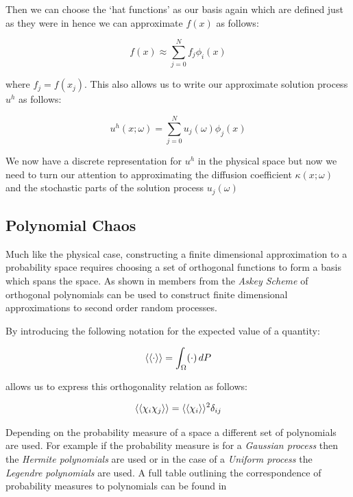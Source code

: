 Then we can choose the `hat functions' as our basis again which are defined
just as they were in  hence we can approximate $f(x)$
as follows:

\begin{equation}\label{eq:oned-stochastic-f-approx}
    f(x) \approx \sum_{j=0}^Nf_j\phi_i(x)
\end{equation}

where $f_j = f(x_j)$. This also allows us to write our approximate solution
process $u^h$ as follows:

\begin{equation}\label{eq:oned-stochastic-uh}
    u^h(x;\omega) = \sum_{j=0}^Nu_j(\omega)\phi_j(x)
\end{equation}

We now have a discrete representation for $u^h$ in the physical space but now
we need to turn our attention to approximating the diffusion coefficient
$\kappa(x;\omega)$ and the stochastic parts of the solution process
$u_j(\omega)$

\subsection{Polynomial Chaos}

Much like the physical case, constructing a finite dimensional approximation to
a probability space requires choosing a set of orthogonal functions to form a
basis which spans the space. As shown in \cite{gpc} members from the
\textit{Askey Scheme} of orthogonal polynomials can be used to construct finite
dimensional approximations to second order random processes.

By introducing the following notation for the expected value of a quantity:

\begin{equation}\label{eq:oned-stochastic-expect-notation}
    \left\langle\langle\cdot\right\rangle\rangle = \int_{\Omega}(\cdot) \,dP
\end{equation}

allows us to express this orthogonality relation as follows:

\begin{equation}\label{oned-stochastic-orthog-relation}
    \left\langle\langle\chi_i\chi_j\right\rangle\rangle = \left\langle\langle\chi_i\right\rangle\rangle^2\delta_{ij}
\end{equation}

Depending on the probability measure of a space a different set of polynomials
are used. For example if the probability measure is for a
\textit{Gaussian process} then the \textit{Hermite polynomials} are used or in
the case of a \textit{Uniform process} the \textit{Legendre polynomials} are
used. A full table outlining the correspondence of probability measures to
polynomials can be found in \cite{general-poly-chaos}

